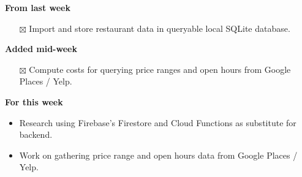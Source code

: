 \documentclass[12pt,letterpaper]{article}
\newcommand{\done}{$\boxtimes$}
\begin{document}
\textbf{From last week}
\begin{itemize}
  \item[\done] Import and store restaurant data in queryable local SQLite database.
\end{itemize}

\textbf{Added mid-week}
\begin{itemize}
  \item[\done] Compute costs for querying price ranges and open hours from Google Places / Yelp.
\end{itemize}

\textbf{For this week}
\begin{itemize}
  \item Research using Firebase's Firestore and Cloud Functions as substitute for backend.
  \item Work on gathering price range and open hours data from Google Places / Yelp.
\end{itemize}
\end{document}

